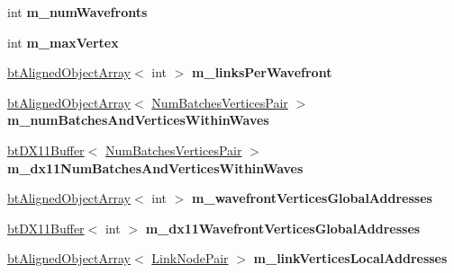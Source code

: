 \begin{DoxyCompactItemize}
int {\bfseries m\+\_\+num\+Wavefronts}
\item 
\mbox{\label{classbtSoftBodyLinkDataDX11SIMDAware_a3b0c58240b8ec7739681ba8fed871a42}} 
int {\bfseries m\+\_\+max\+Vertex}
\item 
\mbox{\label{classbtSoftBodyLinkDataDX11SIMDAware_a7c1b308b7d0dcb30f04fb4cb1637f28d}} 
\hyperlink{classbtAlignedObjectArray}{bt\+Aligned\+Object\+Array}$<$ int $>$ {\bfseries m\+\_\+links\+Per\+Wavefront}
\item 
\mbox{\label{classbtSoftBodyLinkDataDX11SIMDAware_aacf16d02ee32950ac7e2c039f2ac0fe1}} 
\hyperlink{classbtAlignedObjectArray}{bt\+Aligned\+Object\+Array}$<$ \hyperlink{structbtSoftBodyLinkDataDX11SIMDAware_1_1NumBatchesVerticesPair}{Num\+Batches\+Vertices\+Pair} $>$ {\bfseries m\+\_\+num\+Batches\+And\+Vertices\+Within\+Waves}
\item 
\mbox{\label{classbtSoftBodyLinkDataDX11SIMDAware_a0f7876fc5f548ba47ef75cb99efee311}} 
\hyperlink{classbtDX11Buffer}{bt\+D\+X11\+Buffer}$<$ \hyperlink{structbtSoftBodyLinkDataDX11SIMDAware_1_1NumBatchesVerticesPair}{Num\+Batches\+Vertices\+Pair} $>$ {\bfseries m\+\_\+dx11\+Num\+Batches\+And\+Vertices\+Within\+Waves}
\item 
\mbox{\label{classbtSoftBodyLinkDataDX11SIMDAware_a531c47133965f2052e19fde16e4522ac}} 
\hyperlink{classbtAlignedObjectArray}{bt\+Aligned\+Object\+Array}$<$ int $>$ {\bfseries m\+\_\+wavefront\+Vertices\+Global\+Addresses}
\item 
\mbox{\label{classbtSoftBodyLinkDataDX11SIMDAware_a2d7a95d4e2d44dca8919ea65b974bc27}} 
\hyperlink{classbtDX11Buffer}{bt\+D\+X11\+Buffer}$<$ int $>$ {\bfseries m\+\_\+dx11\+Wavefront\+Vertices\+Global\+Addresses}
\item 
\mbox{\label{classbtSoftBodyLinkDataDX11SIMDAware_acc9532e1a7457a277f5bc7fff7cd028b}} 
\hyperlink{classbtAlignedObjectArray}{bt\+Aligned\+Object\+Array}$<$ \hyperlink{classbtSoftBodyLinkData_1_1LinkNodePair}{Link\+Node\+Pair} $>$ {\bfseries m\+\_\+link\+Vertices\+Local\+Addresses}

\end{DoxyCompactItemize}
